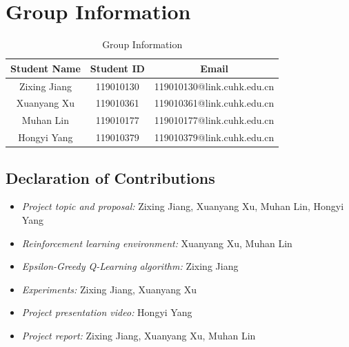 \documentclass[10pt,a4paper]{article}
\begin{document}
\section{Group Information}
\begin{table}[H]
\centering
\begin{tabular}{|c|c|c|}
\hline
\textbf{Student Name} & \textbf{Student ID} & \textbf{Email}\\ 
\hline
Zixing Jiang & 119010130 & 119010130@link.cuhk.edu.cn\\ 
\hline
Xuanyang Xu & 119010361 & 119010361@link.cuhk.edu.cn\\  
\hline
Muhan Lin & 119010177 & 119010177@link.cuhk.edu.cn\\ 
\hline
Hongyi Yang & 119010379 & 119010379@link.cuhk.edu.cn\\ 
\hline
\end{tabular}
\caption{Group Information} 
\label{tab:group}
\end{table}
\subsection*{Declaration of Contributions}
\begin{itemize}
	\item \textit{Project topic and proposal:} Zixing Jiang, Xuanyang Xu, Muhan Lin, Hongyi Yang
	\item \textit{Reinforcement learning environment:} Xuanyang Xu, Muhan Lin
	\item \textit{Epsilon-Greedy Q-Learning algorithm:} Zixing Jiang
	\item \textit{Experiments:} Zixing Jiang, Xuanyang Xu
	\item \textit{Project presentation video:} Hongyi Yang
	\item \textit{Project report:} Zixing Jiang, Xuanyang Xu, Muhan Lin
\end{itemize}
\end{document}
